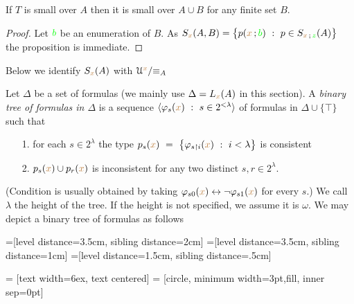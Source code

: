 \begin{proposition}
If $T$ is small over $A$ then it is small over $A\cup B$ for any finite set $B$.
\end{proposition}

\begin{proof}
Let ${\color{green} b}$ be an enumeration of $B$.
As $S_{\mr x}(A,B)=\big\{p({\mr x}\,;{\gr b})\ :\ p\in S_{{\mr x}\,;\,{\gr z}}(A)\big\}$ the proposition is immediate.
\end{proof}

Below we identify $S_{\color{brown} x}(A)$ with $\EuScript U^{\color{brown} x}/\mathord\equiv_A$

\begin{definition}\label{def_tree_formulas}
Let $\Delta$ be a set of formulas (we mainly use $\Delta=L_{\color{brown} x}(A)$ in this section).
A \emph{binary tree of formulas in $\Delta$\/} is a sequence $\<\phi_s({\mr x})\ :\ s\in2^{<\lambda}\>$ of formulas in $\Delta\cup\{\top\}$ such that\nobreak
\begin{itemize}
\item[1.] for each $s\in 2^\lambda$ the type $p_s({\mr x})\ =\ \big\{\phi_{s\restriction i}({\mr x})\ :\ i<\lambda\big\}$ is consistent
\item[2.] $p_s({\color{brown} x})\cup p_r({\color{brown} x})$ is inconsistent for any two distinct $s,r\in 2^\lambda$.
\end{itemize}
(Condition  is usually obtained by taking $\varphi_{s0}({\color{brown} x})\leftrightarrow\neg\varphi_{s1}({\color{brown} x})$ for every $s$.)
We call $\lambda$ the height of the tree.
If the height is not specified, we assume it is $\omega$.
We may depict a binary tree of formulas as follows
\baselineskip

=[level distance=3.5cm, sibling distance=2cm]
=[level distance=3.5cm, sibling distance=1cm]
=[level distance=1.5cm, sibling distance=.5cm]

 = [text width=6ex, text centered]
 = [circle, minimum width=3pt,fill, inner sep=0pt]

\def\leaf{...}


\end{definition}
